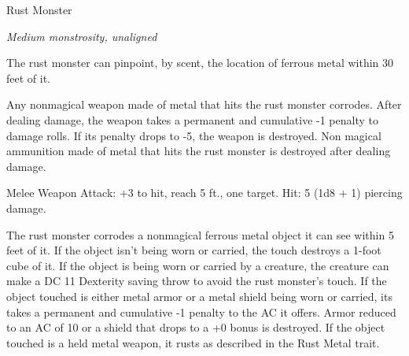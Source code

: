 \begin{monsterbox}{Rust Monster}
\begin{hangingpar}
\textit{Medium monstrosity, unaligned}
\end{hangingpar}
\dndline%
\basics[%
armorclass = 14,
hitpoints = 5d8 + 5,
speed = {40 ft.}
]
\dndline%
\stats[%
STR = \stat{13},
DEX = \stat{12},
CON = \stat{13},
INT = \stat{2},
WIS = \stat{13},
CHA = \stat{6}
]
\dndline%
\details[%
skills={},
damageimmunities={},
savingthrows={},
conditionimmunities={},
damageresistances={},
damagevulnerabilities={},
senses={darkvision 60 ft., passive Perception 11},
challenge=1/2
]
\dndline%
\begin{monsteraction}
The rust monster can pinpoint, by scent, the location of ferrous metal within 30 feet of it.
\end{monsteraction}
\begin{monsteraction}
Any nonmagical weapon made of metal that hits the rust monster corrodes. After dealing damage, the weapon takes a permanent and cumulative -1 penalty to damage rolls. If its penalty drops to -5, the weapon is destroyed. Non magical ammunition made of metal that hits the rust monster is destroyed after dealing damage.
\end{monsteraction}
\begin{monsteraction}[Bite]
Melee Weapon Attack: +3 to hit, reach 5 ft., one target. Hit: 5 (1d8 + 1) piercing damage.
\end{monsteraction}
\begin{monsteraction}[Antennae]
The rust monster corrodes a nonmagical ferrous metal object it can see within 5 feet of it. If the object isn't being worn or carried, the touch destroys a 1-foot cube of it. If the object is being worn or carried by a creature, the creature can make a DC 11 Dexterity saving throw to avoid the rust monster's touch.
If the object touched is either metal armor or a metal shield being worn or carried, its takes a permanent and cumulative -1 penalty to the AC it offers. Armor reduced to an AC of 10 or a shield that drops to a +0 bonus is destroyed. If the object touched is a held metal weapon, it rusts as described in the Rust Metal trait.
\end{monsteraction}
\end{monsterbox}